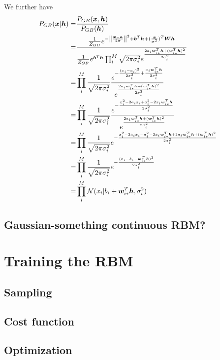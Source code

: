 \documentclass[twoside,english]{uiofysmaster}
\DeclarePairedDelimiter{\norm}{\lVert}{\rVert}
\begin{document}
We further have
\begin{align}
	P_{GB} (\bm{x}|\bm{h})
	=& \frac{P_{GB} (\bm{x}, \bm{h})}{P_{GB} (\bm{h})} \nonumber \\
	=& \frac{\frac{1}{Z_{GB}} e^{-\norm*{\frac{\bm{x} -\bm{a}}{2\bm{\sigma}}}^2 + \bm{b}^T \bm{h} 
	+ (\frac{\bm{x}}{\bm{\sigma}^2})^T \bm{W}\bm{h}}}
	{\frac{1}{Z_{GB}} e^{\bm{b}^T \bm{h}} \prod_i^M
	\sqrt{2\pi \sigma_i^2}
	e^{\frac{2a_i \bm{w}_{i\ast}^T \bm{h} +(\bm{w}_{i\ast}^T \bm{h})^2 }{2\sigma_i^2}}}
	\nonumber \\
	=& \prod_i^M \frac{1}{\sqrt{2\pi \sigma_i^2}}
	\frac{e^{- \frac{(x_i - a_i)^2}{2\sigma_i^2} + \frac{x_i \bm{w}_{i\ast}^T \bm{h}}{2\sigma_i^2} }}
	{e^{\frac{2a_i \bm{w}_{i\ast}^T \bm{h} +(\bm{w}_{i\ast}^T \bm{h})^2 }{2\sigma_i^2}}}
	\nonumber \\
	=& \prod_i^M \frac{1}{\sqrt{2\pi \sigma_i^2}}
	\frac{e^{-\frac{x_i^2 - 2a_i x_i + a_i^2 - 2x_i \bm{w}_{i\ast}^T\bm{h} }{2\sigma_i^2} } }
	{e^{\frac{2a_i \bm{w}_{i\ast}^T \bm{h} +(\bm{w}_{i\ast}^T \bm{h})^2 }{2\sigma_i^2}}}
	\nonumber \\
	=& \prod_i^M \frac{1}{\sqrt{2\pi \sigma_i^2}}
	e^{- \frac{x_i^2 - 2a_i x_i + a_i^2 - 2x_i \bm{w}_{i\ast}^T\bm{h}
	+ 2a_i \bm{w}_{i\ast}^T \bm{h} +(\bm{w}_{i\ast}^T \bm{h})^2}
	{2\sigma_i^2} }
	\nonumber \\
	=& \prod_i^M \frac{1}{\sqrt{2\pi \sigma_i^2}}
	e^{ - \frac{(x_i - b_i - \bm{w}_{i\ast}^T \bm{h})^2}{2\sigma_i^2}} \nonumber \\
	=& \prod_i^M \mathcal{N}
	(x_i | b_i + \bm{w}_{i\ast}^T \bm{h}, \sigma_i^2)
\end{align}

\subsection{Gaussian-something continuous RBM?}

\section{Training the RBM}
\subsection{Sampling}
\subsection{Cost function}
\subsection{Optimization}
\end{document}
